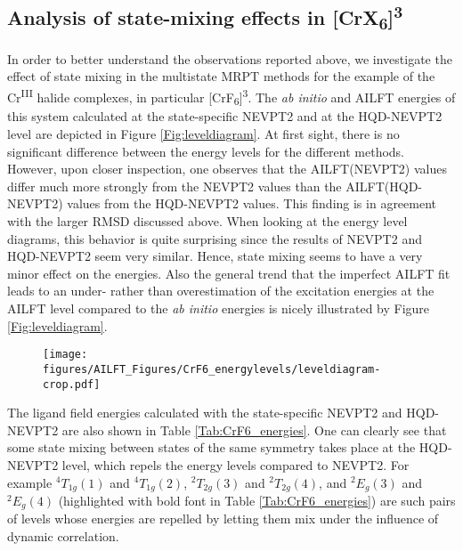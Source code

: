 \subsection{Analysis of state-mixing effects in [CrX\textsubscript{6}]\textsuperscript{3\textminus}}
In order to better understand the observations reported above, we investigate the effect of state mixing in the multistate MRPT methods for the example of the Cr\textsuperscript{III} halide complexes, in particular [CrF\textsubscript{6}]\textsuperscript{3\textminus}. The \textit{ab initio} and AILFT energies of this system calculated at the state-specific NEVPT2 and at the HQD-NEVPT2 level are depicted in Figure \ref{Fig:leveldiagram}. At first sight, there is no significant difference between the energy levels for the different methods. However, upon closer inspection, one observes that the AILFT(NEVPT2) values differ much more strongly from the NEVPT2 values than the AILFT(HQD-NEVPT2) values from the HQD-NEVPT2 values. This finding is in agreement with the larger RMSD discussed above. When looking at the energy level diagrams, this behavior is quite surprising since the results of NEVPT2 and HQD-NEVPT2 seem very similar. Hence, state mixing seems to have a very minor effect on the energies. Also the general trend that the imperfect AILFT fit leads to an under- rather than overestimation of the excitation energies at the AILFT level compared to the \textit{ab initio} energies is nicely illustrated by Figure \ref{Fig:leveldiagram}.
 \begin{figure}
{\texttt{[image: figures/AILFT\_Figures/CrF6\_energylevels/leveldiagram-crop.pdf]}}
\end{figure}
The ligand field energies calculated with the state-specific NEVPT2 and HQD-NEVPT2 are also shown in Table \ref{Tab:CrF6_energies}. One can clearly see that some state mixing between states of the same symmetry takes place at the HQD-NEVPT2 level, which repels the energy levels compared to NEVPT2. For example $^4T_{1g}(1)$ and $^4T_{1g}(2)$, $^2T_{2g}(3)$ and $^2T_{2g}(4)$, and $^2E_{g}(3)$ and $^2E_{g}(4)$ (highlighted with bold font in Table \ref{Tab:CrF6_energies}) are such pairs of levels whose energies are repelled by letting them mix under the influence of dynamic correlation.
